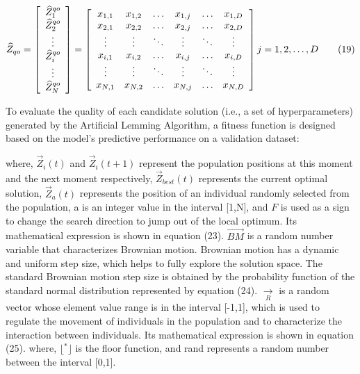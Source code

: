 \documentclass[
  10
]{article}
\begin{document}
\[
\widehat {Z} _ {q o} = \left[ \begin{array}{c} \widehat {Z} _ {1} ^ {q o} \\ \widehat {Z} _ {2} ^ {q o} \\ \vdots \\ \widehat {Z} _ {i} ^ {q o} \\ \vdots \\ \widehat {Z} _ {N} ^ {q o} \end{array} \right] = \left[ \begin{array}{c c c c c c} x _ {1, 1} & x _ {1, 2} & \dots & x _ {1, j} & \dots & x _ {1, D} \\ x _ {2, 1} & x _ {2, 2} & \dots & x _ {2, j} & \dots & x _ {2, D} \\ \vdots & \vdots & \ddots & \vdots & \ddots & \vdots \\ x _ {i, 1} & x _ {i, 2} & \dots & x _ {i, j} & \dots & x _ {i, D} \\ \vdots & \vdots & \ddots & \vdots & \ddots & \vdots \\ x _ {N, 1} & x _ {N, 2} & \dots & x _ {N, j} & \dots & x _ {N, D} \end{array} \right] j = 1, 2, \dots , D \tag {19}
\]

To evaluate the quality of each candidate solution (i.e., a set of
hyperparameters) generated by the Artificial Lemming Algorithm, a
fitness function is designed based on the model's predictive performance
on a validation dataset:

where, \(\vec { Z } _ { i } ( t )\) and \(\vec { Z } _ { i } ( t + 1 )\)
represent the population positions at this moment and the next moment
respectively, \(\overrightarrow { Z } _ { b e s t } ( t )\) represents
the current optimal solution, \(\overrightarrow { Z } _ { a } ( t )\)
represents the position of an individual randomly selected from the
population, a is an integer value in the interval {[}1,N{]}, and \(F\)
is used as a sign to change the search direction to jump out of the
local optimum. Its mathematical expression is shown in equation (23).
\(\overrightarrow { B M }\) is a random number variable that
characterizes Brownian motion. Brownian motion has a dynamic and uniform
step size, which helps to fully explore the solution space. The standard
Brownian motion step size is obtained by the probability function of the
standard normal distribution represented by equation (24).
\(\xrightarrow [ { R } ] { }\) is a random vector whose element value
range is in the interval {[}-1,1{]}, which is used to regulate the
movement of individuals in the population and to characterize the
interaction between individuals. Its mathematical expression is shown in
equation (25). where, \(\lfloor { } ^ { * } \rfloor\) is the floor
function, and rand represents a random number between the interval
{[}0,1{]}.
\end{document}
